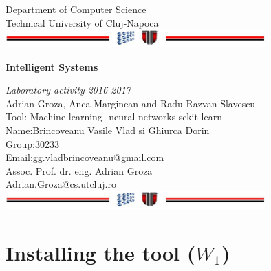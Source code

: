 \documentclass[a4paper,12pt]{report}
\begin{document}
\vspace{-5cm}
\begin{center}
Department of Computer Science\\
Technical University of Cluj-Napoca\\
\includegraphics[width=10cm]{fig/footer}
\end{center}
\vspace{1cm}
\begin{center}
\begin{Large}
\textbf{Intelligent Systems}\\
\end{Large}
\textit{Laboratory activity 2016-2017}\\
\vspace{3cm}
Adrian Groza, Anca Marginean and Radu Razvan Slavescu\\
Tool: Machine learning- neural networks sckit-learn\\
\vspace{1.5cm}
Name:Brincoveanu Vasile Vlad si Ghiurca Dorin\\
Group:30233\\
Email:gg.vladbrincoveanu@gmail.com\\
\vspace{6cm}
Assoc. Prof. dr. eng. Adrian Groza\\
Adrian.Groza@cs.utcluj.ro\\
\vspace{1cm}
\includegraphics[width=10cm]{fig/footer}
\end{center}

\tableofcontents



\chapter{Installing the tool ($W_1$)}
\end{document}
